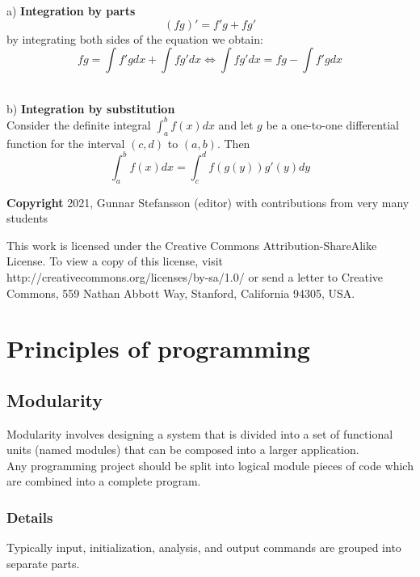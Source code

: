 \documentclass[12pt,a4paper]{article}
\theoremstyle{regla}
\theoremstyle{remark}
\theoremstyle{definition}
\theoremstyle{nonumberbreak}
\begin{document}
a) {\bf Integration by parts}\\

$$(fg)'=f'g+fg'$$
by integrating both sides of the equation we obtain:
$$ fg=\int f'g dx + \int fg' dx \Leftrightarrow \int fg' dx=fg-\int f'g dx$$

\\

b) {\bf Integration by substitution}\\

Consider the definite integral $\int_a^b f(x) dx$ and let $g$ be a one-to-one differential function for the interval $(c,d)$ to $(a,b)$. Then
$$\int_a^b f(x) dx=\int_c^d f(g(y))g'(y) dy$$

{\bf Copyright}
2021, Gunnar Stefansson (editor) with contributions from very many students

This work is licensed under the Creative Commons
Attribution-ShareAlike License. To view a copy of this license, visit
http://creativecommons.org/licenses/by-sa/1.0/ or send a letter to
Creative Commons, 559 Nathan Abbott Way, Stanford, California 94305,
USA.
\clearpage
\section{Principles of programming}
\subsection{Modularity}
\begin{fbox}
\begin{minipage}{0.97\textwidth}
Modularity involves designing a system that is divided into a set of functional units (named modules) that can be composed into a larger application.  \\

Any programming project should be split into logical module pieces of code which are combined into a complete program.


\end{minipage}
\end{fbox}
\subsubsection{Details}
Typically input, initialization, analysis, and output commands are grouped into separate parts.
\end{document}
